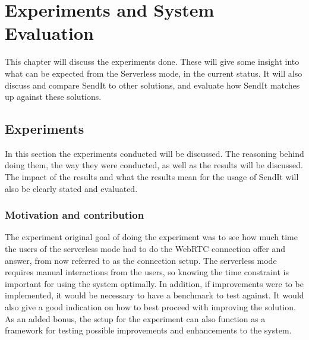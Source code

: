 %
\chapter{Experiments and System Evaluation} %
%
\label{Chapter5} %
%
This chapter will discuss the experiments done. These will give some insight into what can be expected from the Serverless mode, in the current status. It will also discuss and compare SendIt to other solutions, and evaluate how SendIt matches up against these solutions.
%
\section{Experiments}
In this section the experiments conducted will be discussed. The reasoning behind doing them, the way they were conducted, as well as the results will be discussed. The impact of the results and what the results mean for the usage of SendIt will also be clearly stated and evaluated.
%
\subsection{Motivation and contribution}
%
The experiment original goal of doing the experiment was to see how much time the users of the serverless mode had to do the WebRTC connection offer and answer, from now referred to as the connection setup. The serverless mode requires manual interactions from the users, so knowing the time constraint is important for using the system optimally. In addition, if improvements were to be implemented, it would be necessary to have a benchmark to test against. It would also give a good indication on how to best proceed with improving the solution. As an added bonus, the setup for the experiment can also function as a framework for testing possible improvements and enhancements to the system.

